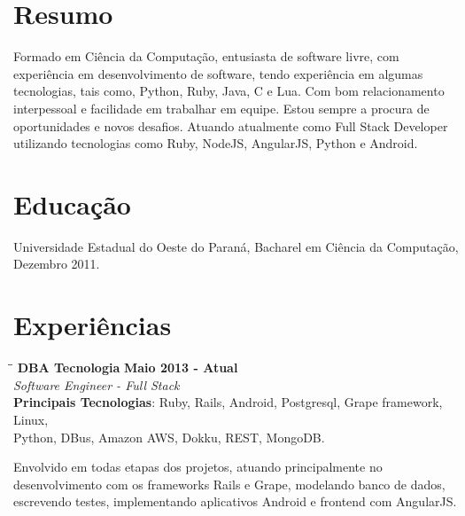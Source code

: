 \documentclass[margin]{res}
\begin{document}

\address{Florianópolis, SC \\ cadicallegari@gmail.com \\ Telefone: (48) 9826 4067}


\begin{resume}

\section{Resumo}       Formado em Ciência da Computação, entusiasta de software livre, com experiência em desenvolvimento de software, tendo experiência em algumas tecnologias, tais como, Python, Ruby, Java, C e Lua. Com bom relacionamento interpessoal e facilidade em trabalhar em equipe. Estou sempre a procura de oportunidades e novos desafios.
Atuando atualmente como Full Stack Developer utilizando tecnologias como Ruby, NodeJS, AngularJS, Python e Android.

\section{Educação}	Universidade Estadual do Oeste do Paraná, Bacharel em Ciência da Computação, Dezembro 2011.

\section{Experiências}

\vspace{-0.1in}
   \begin{tabbing}
   \hspace{2.3in}\= \hspace{1.7in}\= \kill %
    \textbf{DBA Tecnologia}    \>\>\textbf{Maio 2013 - Atual}\\
    \textit{Software Engineer - Full Stack}\\
    \textbf{Principais Tecnologias}: Ruby, Rails, Android, Postgresql, Grape framework, Linux,\\ Python, DBus, Amazon AWS, Dokku, REST, MongoDB.
   \end{tabbing}\vspace{-20pt}      %
    \vspace{2mm}
    
	Envolvido em todas etapas dos projetos, atuando principalmente no desenvolvimento com os frameworks Rails e Grape, modelando banco de dados, escrevendo testes, implementando aplicativos Android e frontend com AngularJS.


\end{resume}
\end{document}
